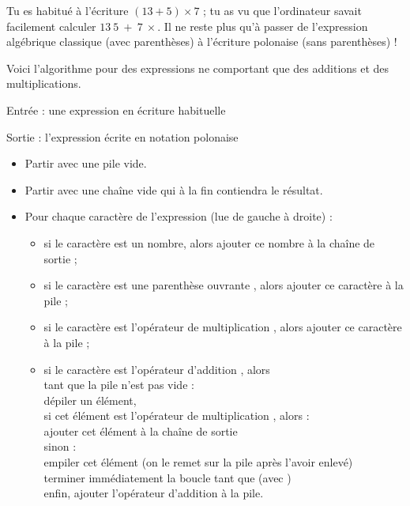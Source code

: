 \documentclass[11pt,class=report,crop=false]{standalone}
\begin{document}
\begin{activite}

 
 
Tu es habitué à l'écriture \og{}$(13+5) \times 7$\fg{} ; tu as vu que l'ordinateur savait facilement calculer \og{}$13 \  5 \ + \ 7 \ \times$\fg{}. Il ne reste plus qu'à passer de l'expression algébrique classique (avec parenthèses) à l'écriture polonaise (sans parenthèses) !

  Voici l'algorithme pour des expressions ne comportant que des additions et des multiplications. 
 
  \begin{algorithme}
  Entrée : une expression en écriture habituelle

  Sortie : l'expression écrite en notation polonaise

  \begin{itemize}
    \item  Partir avec une pile vide.  
    
    \item  Partir avec une chaîne vide  qui à la fin contiendra le résultat.
   
   \item Pour chaque caractère de l'expression (lue de gauche à droite) :
   \begin{itemize} 
     \item si le caractère est un nombre, alors ajouter ce nombre à la chaîne de sortie  ;
     
     \item si le caractère est une parenthèse ouvrante , alors ajouter ce caractère à la pile ;
     
     \item si le caractère est l'opérateur de multiplication , alors ajouter ce caractère à la pile ;  
        
     \item si le caractère est l'opérateur d'addition , alors \\
     tant que la pile n'est pas vide : \\
     \indentation dépiler un élément,\\
     \indentation si cet élément est l'opérateur de multiplication , alors :\\
     \indentation \indentation ajouter cet élément à la chaîne de sortie \\
     \indentation sinon :\\
     \indentation \indentation empiler cet élément (on le remet sur la pile après l'avoir enlevé)\\
     \indentation \indentation terminer immédiatement la boucle \og{}tant que\fg{} (avec )\\              
     enfin, ajouter l'opérateur d'addition  à la pile.


\end{itemize}
\end{itemize}
\end{algorithme}
\end{activite}
\end{document}
